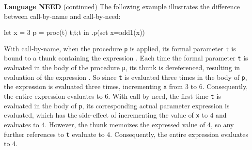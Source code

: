 \begin{minipage}[t]{\sw}
\slidenumber
\LARGE
{\bf Language NEED} (continued)\exx
The following example illustrates the difference
between call-by-name and call-by-need:
\begin{qv}
let
  x = 3
  p = proc(t) {t;t;t}
in
  .p(set x=add1(x))
\end{qv}
\LARGE
With call-by-name,
when the procedure \verb'p' is applied,
its formal parameter \verb't' is bound to a thunk
containing the expression .
Each time the formal parameter \verb't' is evaluated
in the body of the procedure \verb'p',
its thunk is dereferenced, resulting
in evaluation of the expression .
So since \verb't' is evaluated three times in the body of \verb'p',
the expression  is evaluated three times,
incrementing \verb'x' from 3 to 6.
Consequently, the entire expression evaluates to 6.\exx
With call-by-need,
the first time \verb't' is evaluated in the body of \verb'p',
its corresponding actual parameter expression 
is evaluated,
which has the side-effect of incrementing the value of \verb'x' to 4
and evaluates to 4.
However, the thunk memoizes the expressed value of 4,
so any further references to \verb't' evaluate to 4.
Consequently, the entire expression evaluates to 4.
\end{minipage}
